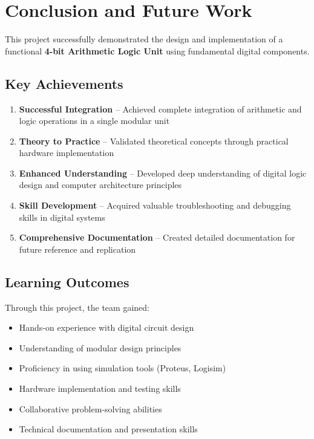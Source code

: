 \chapter{Conclusion and Future Work}

This project successfully demonstrated the design and implementation of a functional \textbf{4-bit Arithmetic Logic Unit} using fundamental digital components.

\section{Key Achievements}

\begin{enumerate}
    \item \textbf{Successful Integration} -- Achieved complete integration of arithmetic and logic operations in a single modular unit
    \item \textbf{Theory to Practice} -- Validated theoretical concepts through practical hardware implementation
    \item \textbf{Enhanced Understanding} -- Developed deep understanding of digital logic design and computer architecture principles
    \item \textbf{Skill Development} -- Acquired valuable troubleshooting and debugging skills in digital systems
    \item \textbf{Comprehensive Documentation} -- Created detailed documentation for future reference and replication
\end{enumerate}

\section{Learning Outcomes}

Through this project, the team gained:
\begin{itemize}
    \item Hands-on experience with digital circuit design
    \item Understanding of modular design principles
    \item Proficiency in using simulation tools (Proteus, Logisim)
    \item Hardware implementation and testing skills
    \item Collaborative problem-solving abilities
    \item Technical documentation and presentation skills
\end{itemize}

